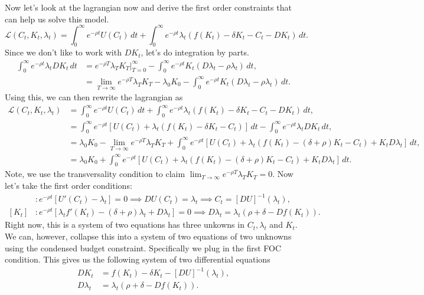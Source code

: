 \documentclass[11pt,english]{article}
\begin{document}
Now let's look at the lagrangian now and derive the first order constraints that can help us solve this model.
$$\mathcal{L}(C_t, K_t, \lambda_t) = \int_0^\infty e^{-\rho t}U(C_t)\,dt + \int_0^\infty e^{-\rho t}\lambda_t(f(K_t) - \delta K_t - C_t - DK_t)\,dt.$$
Since we don't like to work with $DK_t$, let's do integration by parts.
\begin{align*}
\int_0^\infty e^{-\rho t} \lambda_t DK_t\,dt &= e^{-\rho T} \lambda_T K_T \Big|_{T=0}^\infty - \int_0^\infty e^{-\rho t}K_t(D\lambda_t -\rho \lambda_t)\,dt,\\
&= \lim_{T\to \infty}e^{-\rho T} \lambda_T K_T  - \lambda_0K_0 - \int_0^\infty e^{-\rho t}K_t(D\lambda_t -\rho \lambda_t)\,dt.
\end{align*}Using this, we can then rewrite the lagrangian as 
\begin{align*}
\mathcal{L}(C_t, K_t, \lambda_t) &= \int_0^\infty e^{-\rho t}U(C_t)\,dt + \int_0^\infty e^{-\rho t}\lambda_t(f(K_t) - \delta K_t - C_t - DK_t)\,dt,\\
&= \int_0^\infty e^{-\rho t}\left[U(C_t) + \lambda_t(f(K_t) - \delta K_t - C_t)\right]\,dt - \int_0^\infty e^{-\rho t}\lambda_t DK_t\,dt,\\
&= \lambda_0K_0 - \lim_{T\to \infty}e^{-\rho T}\lambda_TK_T +  \int_0^\infty e^{-\rho t}\left[U(C_t) + \lambda_t(f(K_t) - (\delta +\rho)K_t - C_t) + K_tD\lambda_t\right]\,dt,\\
&= \lambda_0K_0 +  \int_0^\infty e^{-\rho t}\left[U(C_t) + \lambda_t(f(K_t) - (\delta +\rho)K_t - C_t) + K_tD\lambda_t\right]\,dt.
\end{align*}Note, we use the transversality condition to claim $\lim_{T\to \infty}e^{-\rho T}\lambda_TK_T = 0$. Now let's take the first order conditions:
\begin{align*}
[C_t]&: e^{-\rho t}[ U'(C_t) -  \lambda_t] = 0\implies DU(C_t) = \lambda_t \implies C_t = [DU]^{-1}(\lambda_t),\\
[K_t]&: e^{-\rho t}[ \lambda_t f'(K_t) - (\delta + \rho)\lambda_t + D\lambda_t] = 0 \implies D\lambda_t = \lambda_t(\rho + \delta - Df(K_t)).
\end{align*} Right now, this is a system of two equations has three unkowns in $C_t, \lambda_t$ and $K_t$. We can, however, collapse this into a system of two equations of two unknowns using the condensed budget constraint. Specifically we plug in the first FOC condition. This gives us the following system of two differential equations
\begin{align*}
DK_t &= f(K_t) - \delta K_t - [DU]^{-1}(\lambda_t),\\
D\lambda_t &= \lambda_t(\rho + \delta - Df(K_t)).
\end{align*}
\end{document}
